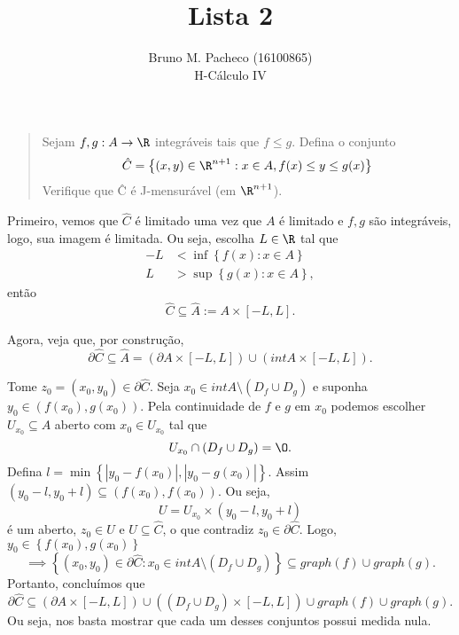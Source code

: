 \documentclass[a4paper]{report}
\begin{document}
 
\title{Lista 2}
\author{Bruno M. Pacheco (16100865)\\
H-Cálculo IV}
 
\maketitle
 

\begin{quote}
Sejam $f,g: A\to \R$ integráveis tais que $f\le g$. Defina o conjunto \[
\hat{C} = \left\{ ( x,y ) \in  \R^{n+1}: x\in  A, f( x ) \le  y \le  g( x )  \right\} 
\] Verifique que Ĉ é J-mensurável (em $\R^{n+1}$).
\end{quote}

Primeiro, vemos que $\hat{C}$ é limitado uma vez que $A$ é limitado e $f,g$ são integráveis, logo, sua imagem é limitada. Ou seja, escolha $L\in \R$ tal que 
\begin{align*}
    -L &< \inf\left\{ f\left( x \right) : x\in A \right\} \\
    L&> \sup \left\{ g\left( x \right) : x\in A \right\} 
,\end{align*}
então \[
\hat{C}\subseteq \hat{A} := A\times \left[ -L,L \right] 
.\] 

Agora, veja que, por construção, \[
\partial \hat{C} \subseteq \hat{A} = \left(  \partial A \times \left[ -L,L \right]  \right) \cup \left( int A \times \left[ -L,L \right]  \right) 
.\] 

Tome $z_0=\left( x_0,y_0 \right) \in \partial \hat{C}$. Seja $x_0 \in int A \setminus \left(  D_f \cup D_g\right) $ e suponha $y_0 \in \left( f\left( x_0 \right) , g\left( x_0 \right)  \right) $. Pela continuidade de $f$ e $g$ em $x_0$ podemos escolher $U_{x_0} \subseteq A$ aberto com $x_0\in U_{x_0}$ tal que \[
U_{x_0} \cap \left( D_f \cup D_g \right) = \O
.\] Defina $l = \min\left\{ \left| y_0-f\left( x_0 \right)  \right| , \left| y_0-g\left( x_0 \right)  \right|  \right\} $. Assim $\left( y_0-l,y_0+l \right) \subseteq \left( f\left( x_0 \right) , f\left( x_0 \right)  \right) $. Ou seja, \[
U = U_{x_0}\times \left( y_0-l,y_0+l \right)
\] é um aberto, $z_0\in U$ e $U\subseteq \hat{C}$, o que contradiz $z_0\in \partial \hat{C}$. Logo, $y_0\in \left\{ f\left( x_0 \right) , g\left( x_0 \right)  \right\} $ \[
\implies \left\{ \left( x_0,y_0 \right) \in \partial \hat{C} : x_0\in int A \setminus \left( D_f\cup D_g \right) \right\} \subseteq graph\left( f \right) \cup graph\left( g \right) 
.\] Portanto, concluímos que \[
\partial \hat{C} \subseteq \left(  \partial A \times \left[ -L,L \right]  \right) \cup \left(  \left( D_f \cup D_g \right) \times \left[ -L,L \right]  \right) \cup graph\left( f \right) \cup graph\left( g \right)  \tag{$*$}
.\] Ou seja, nos basta mostrar que cada um desses conjuntos possui medida nula.
\end{document}

